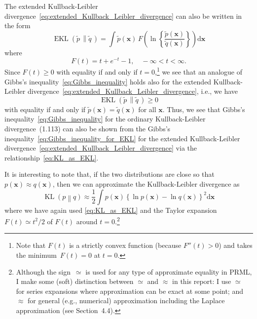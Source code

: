 \documentclass[12pt,a4paper]{article}
\begin{document}
The extended Kullback-Leibler divergence~\eqref{eq:extended_Kullback_Leibler_divergence}
can also be written in the form
\begin{equation}
\operatorname{EKL}\left(\widetilde{p}^{\,}\middle\|\widetilde{q}^{\,}\right)
=
\int \widetilde{p}(\mathbf{x}) \,
F\left(
\ln\left\{ \frac{\widetilde{p}(\mathbf{x})}{\widetilde{q}(\mathbf{x})} \right\}
\right)
\mathrm{d}\mathbf{x}
\end{equation}
where
\begin{equation}
F(t) = t + e^{-t} - 1, \quad -\infty < t < \infty .
\end{equation}
Since $F(t) \geqslant 0$ with equality if and only if $t = 0$,\footnote{%
Note that $F(t)$ is a strictly convex function (because $F''(t) > 0$) and
takes the minimum~$F(t) = 0$ at $t = 0$.}
we see that an analogue of Gibbs's inequality~\eqref{eq:Gibbs_inequality} holds also for
the extended Kullback-Leibler divergence~\eqref{eq:extended_Kullback_Leibler_divergence},
i.e., we have
\begin{equation}
\operatorname{EKL}\left(\widetilde{p}^{\,}\middle\|\widetilde{q}^{\,}\right) \geqslant 0
\label{eq:Gibbs_inequality_for_EKL}
\end{equation}
with equality if and only if $\widetilde{p}(\mathbf{x}) = \widetilde{q}(\mathbf{x})$
for all $\mathbf{x}$.
Thus, we see that Gibbs's inequality~\eqref{eq:Gibbs_inequality} for
the ordinary Kullback-Leibler divergence~(1.113) can also be shown
from the Gibbs's inequality~\eqref{eq:Gibbs_inequality_for_EKL} for
the extended Kullback-Leibler divergence~\eqref{eq:extended_Kullback_Leibler_divergence}
via the relationship~\eqref{eq:KL_as_EKL}.

It is interesting to note that,
if the two distributions are close so that $p(\mathbf{x}) \approx q(\mathbf{x})$,
then we can approximate the Kullback-Leibler divergence as
\begin{equation}
\operatorname{KL}\left(p\middle\|q\right) \approx
\frac{1}{2} \int
p(\mathbf{x})
\left\{
\ln p(\mathbf{x}) -
\ln q(\mathbf{x})
\right\}^2
\mathrm{d}\mathbf{x}
\end{equation}
where we have again used \eqref{eq:KL_as_EKL} and
the Taylor expansion~$F(t) \simeq t^2/2$ of $F(t)$ around $t = 0$.\footnote{%
Although the sign~$\simeq$ is used for any type of approximate equality in PRML,
I make some (soft) distinction between $\simeq$ and $\approx$ in this report:
I use $\simeq$ for series expansions where approximation can be exact at some point; and
$\approx$ for general (e.g., numerical) approximation including the Laplace approximation
(see Section~4.4).}
\end{document}
